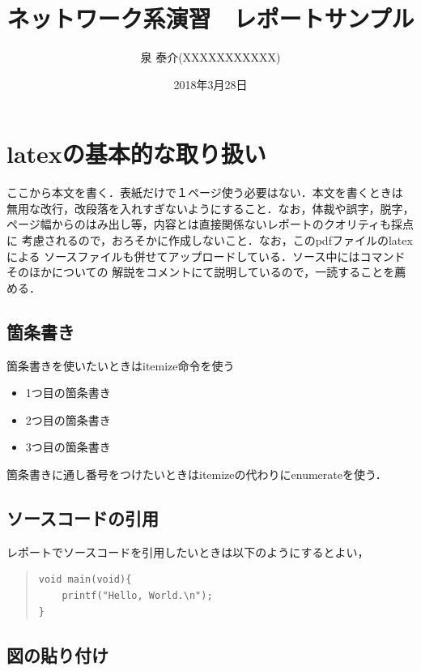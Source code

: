 \documentclass[a4paper,11pt,dvipdfmx]{jsarticle}
\title{ネットワーク系演習　レポートサンプル}
\author{泉 泰介(XXXXXXXXXXX)} %
\date{2018年3月28日} %
\begin{document}
\maketitle  %

\section{latexの基本的な取り扱い}

ここから本文を書く．表紙だけで１ページ使う必要はない．本文を書くときは
無用な改行，改段落を入れすぎないようにすること．なお，体裁や誤字，脱字，
ページ幅からのはみ出し等，内容とは直接関係ないレポートのクオリティも採点に
考慮されるので，おろそかに作成しないこと．なお，このpdfファイルのlatexによる
ソースファイルも併せてアップロードしている．ソース中にはコマンドそのほかについての
解説をコメントにて説明しているので，一読することを薦める．

\subsection{箇条書き}
箇条書きを使いたいときはitemize命令を使う

\begin{itemize}
\item 1つ目の箇条書き
\item 2つ目の箇条書き
\item 3つ目の箇条書き
\end{itemize}

箇条書きに通し番号をつけたいときはitemizeの代わりにenumerateを使う．

\subsection{ソースコードの引用}

レポートでソースコードを引用したいときは以下のようにするとよい，

\begin{quote}
\begin{verbatim}
void main(void){
    printf("Hello, World.\n");
}
\end{verbatim}
\end{quote}

\newpage

\subsection{図の貼り付け}
\end{document}
